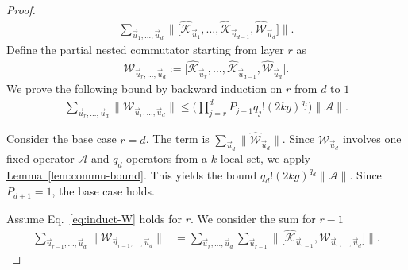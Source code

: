 \documentclass[aps,pra,reprint,groupedaddress,floatfix]{revtex4-2}
\newcommand{\lem}[1]{\hyperref[lem:#1]{Lemma~\ref*{lem:#1}}}
\newcommand{\mc}{\mathcal}
\begin{document}
\begin{proof}
    \begin{align*}
        \sum_{\vec{u}_{1}, \ldots, \vec{u}_{d}} \bigg\| \Big[ \hat{\mathcal{K}}_{\vec{u}_1}, \ldots, \hat{\mathcal{K}}_{\vec{u}_{d-1}}, 
        \hat{\mathcal{W}}_{\vec{u}_d} \Big] \bigg\|.
    \end{align*}
    Define the partial nested commutator starting from layer $r$ as
    \begin{align*}
        \mathcal{W}_{\vec{u}_{r}, \ldots, \vec{u}_d} := \Big[ \hat{\mathcal{K}}_{\vec{u}_r}, \ldots, \hat{\mathcal{K}}_{\vec{u}_{d-1}}, \hat{\mathcal{W}}_{\vec{u}_d} \Big].
    \end{align*}
    We prove the following bound by backward induction on $r$ from $d$ to $1$
    \begin{align} \label{eq:induct-W}
        \sum_{\vec{u}_{r}, \ldots, \vec{u}_{d}} \Big\|\mathcal{W}_{\vec{u}_{r}, \ldots, \vec{u}_d}\Big\|\le \bigg(\prod_{j=r}^{d}P_{j+1} q_j!(2kg)^{q_j}\bigg)\|\mc A\|.
    \end{align}
    
    Consider the base case $r=d$. The term is $\sum_{\vec{u}_d} \|\hat{\mathcal{W}}_{\vec{u}_d}\|$. Since $\mathcal{W}_{\vec{u}_d}$ involves one fixed operator $\mathcal{A}$ and $q_d$ operators from a $k$-local set, we apply \lem{commu-bound}. This yields the bound $q_d!(2kg)^{q_d}\|\mathcal{A}\|$. Since $P_{d+1}=1$, the base case holds.

    Assume Eq.~\eqref{eq:induct-W} holds for $r$. We consider the sum for $r-1$
    \begin{align*}
        \sum_{\vec{u}_{r-1}, \ldots, \vec{u}_d} \Big\|\mathcal{W}_{\vec{u}_{r-1}, \ldots, \vec{u}_d}\Big\| 
        &= \sum_{\vec{u}_{r}, \ldots, \vec{u}_d} \sum_{\vec{u}_{r-1}} \bigg\| \Big[ \hat{\mathcal{K}}_{\vec{u}_{r-1}}, \mathcal{W}_{\vec{u}_{r}, \ldots, \vec{u}_d} \Big] \bigg\|.
    \end{align*}


\end{proof}
\end{document}
